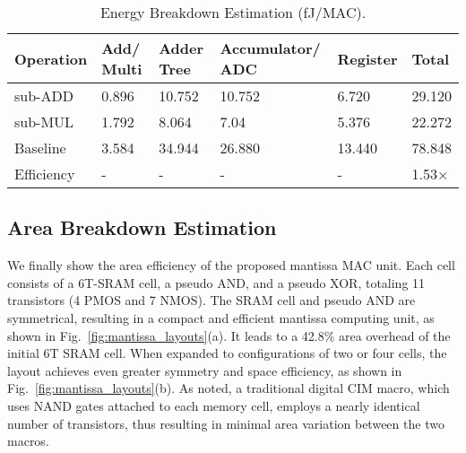\begin{table}[h]
    \centering
    \renewcommand{\arraystretch}{1.2} %
    \caption{Energy Breakdown Estimation (fJ/MAC).}
                 \vskip -6pt
    \begin{tabular}{|p{1.2cm}|p{1cm}|p{1cm}|p{1.5cm}|p{1.1cm}|p{0.8cm}|}
        \hline
        \textbf{Operation} & \textbf{Add/} 
        \textbf{Multi}& \textbf{Adder Tree} & \textbf{Accumulator}/ \textbf{ADC}& \textbf{Register} & \textbf{Total} \\
        \hline
        sub-ADD  & 0.896 & 10.752 & 10.752 & 6.720 & 29.120\\
        \hline
        sub-MUL  & 1.792 & 8.064& 7.04& 5.376& 22.272 \\
        \hline
        Baseline  & 3.584 & 34.944 & 26.880 & 13.440  & 78.848\\
        \hline
        Efficiency & - & - & - &- & 1.53$\times$ \\
        \hline
    \end{tabular}  \label{tab:energy_breakdown}
             \vskip -12pt
\end{table}

\subsection{Area Breakdown Estimation}

We finally show the area efficiency of the proposed mantissa MAC unit.
Each cell consists of a 6T-SRAM cell, a pseudo AND, and a pseudo XOR, totaling 11 transistors (4 PMOS and 7 NMOS). 
The SRAM cell and pseudo AND are symmetrical, resulting in a compact and efficient mantissa computing unit, as shown in Fig.~\ref{fig:mantissa_layouts}(a).
It leads to a 42.8\% area overhead of the initial 6T SRAM cell.
When expanded to configurations of two or four cells, the layout achieves even greater symmetry and space efficiency, as shown in Fig.~\ref{fig:mantissa_layouts}(b).
As noted, a traditional digital CIM macro, which uses NAND gates attached to each memory cell, employs a nearly identical number of transistors, thus resulting in minimal area variation between the two macros.





